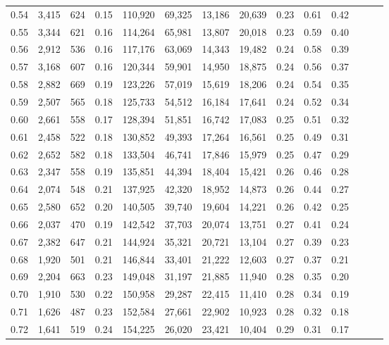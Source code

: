 \begin{tabular}{rrrrrrrrrrrrrr}
0.54 &  3,415 &  624 &  0.15 &  110,920 &   69,325 &  13,186 &  20,639 &  0.23 &  0.61 &      0.42 \\
0.55 &  3,344 &  621 &  0.16 &  114,264 &   65,981 &  13,807 &  20,018 &  0.23 &  0.59 &      0.40 \\
0.56 &  2,912 &  536 &  0.16 &  117,176 &   63,069 &  14,343 &  19,482 &  0.24 &  0.58 &      0.39 \\
0.57 &  3,168 &  607 &  0.16 &  120,344 &   59,901 &  14,950 &  18,875 &  0.24 &  0.56 &      0.37 \\
0.58 &  2,882 &  669 &  0.19 &  123,226 &   57,019 &  15,619 &  18,206 &  0.24 &  0.54 &      0.35 \\
0.59 &  2,507 &  565 &  0.18 &  125,733 &   54,512 &  16,184 &  17,641 &  0.24 &  0.52 &      0.34 \\
0.60 &  2,661 &  558 &  0.17 &  128,394 &   51,851 &  16,742 &  17,083 &  0.25 &  0.51 &      0.32 \\
0.61 &  2,458 &  522 &  0.18 &  130,852 &   49,393 &  17,264 &  16,561 &  0.25 &  0.49 &      0.31 \\
0.62 &  2,652 &  582 &  0.18 &  133,504 &   46,741 &  17,846 &  15,979 &  0.25 &  0.47 &      0.29 \\
0.63 &  2,347 &  558 &  0.19 &  135,851 &   44,394 &  18,404 &  15,421 &  0.26 &  0.46 &      0.28 \\
0.64 &  2,074 &  548 &  0.21 &  137,925 &   42,320 &  18,952 &  14,873 &  0.26 &  0.44 &      0.27 \\
0.65 &  2,580 &  652 &  0.20 &  140,505 &   39,740 &  19,604 &  14,221 &  0.26 &  0.42 &      0.25 \\
0.66 &  2,037 &  470 &  0.19 &  142,542 &   37,703 &  20,074 &  13,751 &  0.27 &  0.41 &      0.24 \\
0.67 &  2,382 &  647 &  0.21 &  144,924 &   35,321 &  20,721 &  13,104 &  0.27 &  0.39 &      0.23 \\
0.68 &  1,920 &  501 &  0.21 &  146,844 &   33,401 &  21,222 &  12,603 &  0.27 &  0.37 &      0.21 \\
0.69 &  2,204 &  663 &  0.23 &  149,048 &   31,197 &  21,885 &  11,940 &  0.28 &  0.35 &      0.20 \\
0.70 &  1,910 &  530 &  0.22 &  150,958 &   29,287 &  22,415 &  11,410 &  0.28 &  0.34 &      0.19 \\
0.71 &  1,626 &  487 &  0.23 &  152,584 &   27,661 &  22,902 &  10,923 &  0.28 &  0.32 &      0.18 \\
0.72 &  1,641 &  519 &  0.24 &  154,225 &   26,020 &  23,421 &  10,404 &  0.29 &  0.31 &      0.17 \\

\end{tabular}
